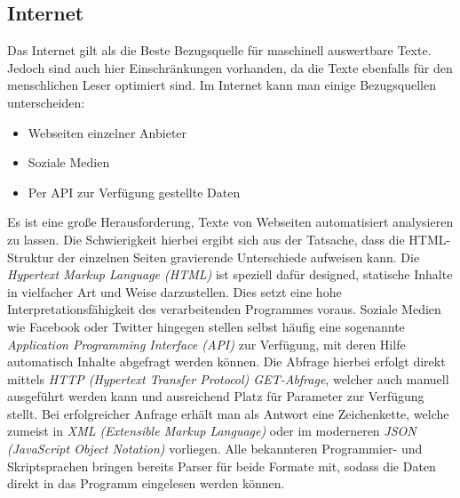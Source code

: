 \subsection{Internet}
Das Internet gilt als die Beste Bezugsquelle für maschinell auswertbare Texte. Jedoch sind auch hier Einschränkungen vorhanden, da die Texte ebenfalls für den menschlichen Leser optimiert sind. Im Internet kann man einige Bezugsquellen unterscheiden:
\begin{itemize}
\item Webseiten einzelner Anbieter
\item Soziale Medien
\item Per API zur Verfügung gestellte Daten
\end{itemize}
Es ist eine große Herausforderung, Texte von Webseiten automatisiert analysieren zu lassen. Die Schwierigkeit hierbei ergibt sich aus der Tatsache, dass die HTML-Struktur der einzelnen Seiten gravierende Unterschiede aufweisen kann. Die \textit{Hypertext Markup Language (HTML)} ist speziell dafür designed, statische Inhalte in vielfacher Art und Weise darzustellen. Dies setzt eine hohe Interpretationsfähigkeit des verarbeitenden Programmes voraus.
\newline
Soziale Medien wie Facebook oder Twitter hingegen stellen selbst häufig eine sogenannte \textit{Application Programming Interface (API)} zur Verfügung, mit deren Hilfe automatisch Inhalte abgefragt werden können. Die Abfrage hierbei erfolgt direkt mittels \textit{HTTP (Hypertext Transfer Protocol) GET-Abfrage}, welcher auch manuell ausgeführt werden kann und ausreichend Platz für Parameter zur Verfügung stellt. Bei erfolgreicher Anfrage erhält man als Antwort eine Zeichenkette, welche zumeist in \textit{XML (Extensible Markup Language)} oder im moderneren \textit{JSON (JavaScript Object Notation)} vorliegen. Alle bekannteren Programmier- und Skriptsprachen bringen bereits Parser für beide Formate mit, sodass die Daten direkt in das Programm eingelesen werden können.

